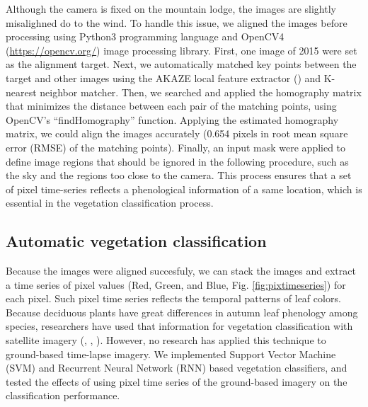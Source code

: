 \documentclass{article}
\begin{document}
Although the camera is fixed on the mountain lodge, the images are slightly misalighned do to the wind. To handle this issue, we aligned the images before processing using Python3 programming language and OpenCV4 (\url{https://opencv.org/}) image processing library. First, one image of 2015 were set as the alignment target. Next, we automatically matched key points between the target and other images using the AKAZE local feature extractor (\cite{Alcantarilla2013AKAZE}) and K-nearest neighbor matcher. Then, we searched and applied the homography matrix that minimizes the distance between each pair of the matching points, using OpenCV's ``findHomography'' function. Applying the estimated homography matrix, we could align the images accurately (0.654 pixels in root mean square error (RMSE) of the matching points). Finally, an input mask were applied to define image regions that should be ignored in the following procedure, such as the sky and the regions too close to the camera. This process ensures that a set of pixel time-series reflects a phenological information of a same location, which is essential in the vegetation classification process.

\hypertarget{automatic-vegetation-classification}{%
\subsection{Automatic vegetation classification}\label{automatic-vegetation-classification}}

Because the images were aligned succesfuly, we can stack the images and extract a time series of pixel values (Red, Green, and Blue, Fig. \ref{fig:pixtimeseries}) for each pixel. Such pixel time series reflects the temporal patterns of leaf colors. Because deciduous plants have great differences in autumn leaf phenology among species, researchers have used that information for vegetation classification with satellite imagery (\cite{Tigges2013RemSenEnv}, \cite{Son2013RemSen}, \cite{Heupel2018PFG}). However, no research has applied this technique to ground-based time-lapse imagery. We implemented Support Vector Machine (SVM) and Recurrent Neural Network (RNN) based vegetation classifiers, and tested the effects of using pixel time series of the ground-based imagery on the classification performance.
\end{document}
